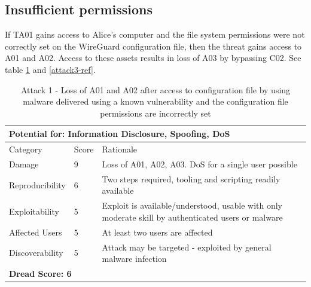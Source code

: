 \documentclass [11pt, proquest] {uwthesis}[2020/02/24]
\begin{document}
\subsection{Insufficient permissions}
If TA01 gains access to Alice's computer and the file system permissions were not correctly set on the WireGuard configuration file, then the threat gains access to A01 and A02. Access to these assets results in loss of A03 by bypassing C02. 
See table \ref{attack1-ref} and \ref{attack3-ref}.
\begin{table}[H]
\label{attack1-ref}
\begin{tabular}{|m{3cm}|m{.9cm}|p{27em} |}
\multicolumn{3}{l}{Potential for: Information Disclosure, Spoofing, DoS}                   \\
\hline
Category & Score & Rationale                                                    \\
\hline
Damage          & 9     & Loss of A01, A02, A03. DoS for a single user possible            \\
\hline
Reproducibility & 6     & Two steps required, tooling and scripting readily available    \\
\hline
Exploitability & 5      & Exploit is available/understood, usable with only moderate skill by authenticated users or malware \\
\hline
Affected Users  & 5     & At least two users are affected                     \\
\hline
Discoverability & 5     & Attack may be targeted - exploited by general malware infection \\
\hline
\multicolumn{3}{l}{\textbf{Dread Score: 6}} 
\end{tabular}
\caption{Attack 1 - Loss of A01 and A02 after access to configuration file by using malware delivered using a known vulnerability and the configuration file permissions are incorrectly set}
\end{table}
\end{document}
